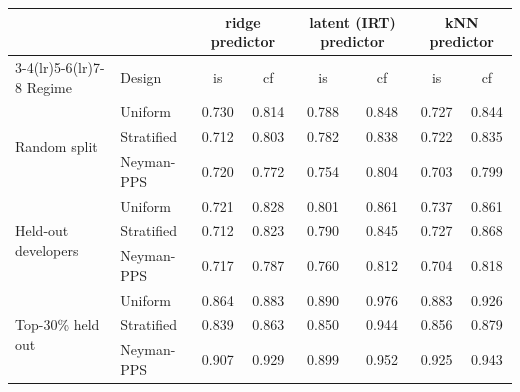 \begin{tabular}{ll cc cc cc}
\toprule
 & & \multicolumn{2}{c}{ridge predictor} & \multicolumn{2}{c}{latent (IRT) predictor} & \multicolumn{2}{c}{kNN predictor}\\
\cmidrule(lr){3-4}\cmidrule(lr){5-6}\cmidrule(lr){7-8}
Regime & Design & is & cf & is & cf & is & cf\\
\midrule
\multirow{3}{*}{Random split} & Uniform & 0.730 & 0.814 & 0.788 & 0.848 & 0.727 & 0.844 \\
 & Stratified & 0.712 & 0.803 & 0.782 & 0.838 & 0.722 & 0.835 \\
 & Neyman-PPS & 0.720 & 0.772 & 0.754 & 0.804 & 0.703 & 0.799 \\
\midrule
\multirow{3}{*}{Held-out developers} & Uniform & 0.721 & 0.828 & 0.801 & 0.861 & 0.737 & 0.861 \\
 & Stratified & 0.712 & 0.823 & 0.790 & 0.845 & 0.727 & 0.868 \\
 & Neyman-PPS & 0.717 & 0.787 & 0.760 & 0.812 & 0.704 & 0.818 \\
\midrule
\multirow{3}{*}{Top-30\% held out} & Uniform & 0.864 & 0.883 & 0.890 & 0.976 & 0.883 & 0.926 \\
 & Stratified & 0.839 & 0.863 & 0.850 & 0.944 & 0.856 & 0.879 \\
 & Neyman-PPS & 0.907 & 0.929 & 0.899 & 0.952 & 0.925 & 0.943 \\
\bottomrule
\end{tabular}
